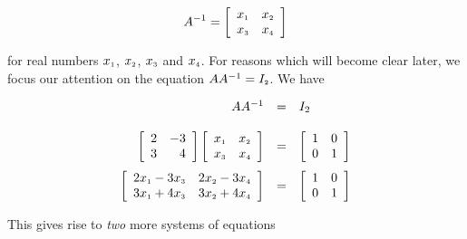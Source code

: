 \documentclass{ximera}
\begin{document}
\[  A^{-1} = \left[ \begin{array}{rr} x_{\mbox{\tiny$1$}} & x_{\mbox{\tiny$2$}} \\ x_{\mbox{\tiny$3$}} & x_{\mbox{\tiny$4$}} \\ \end{array} \right]\]

for real numbers $x_{\mbox{\tiny$1$}}$, $x_{\mbox{\tiny$2$}}$, $x_{\mbox{\tiny$3$}}$ and $x_{\mbox{\tiny$4$}}$.  For reasons which will become clear later, we focus our attention on the equation $AA^{-1} = I_{\mbox{\tiny$2$}}$.  We have

\[\begin{array}{rcl}

AA^{-1} & = & I_{2} \\ [13pt]

\left[ \begin{array}{rr} 2 & -3 \\ 3 & 4 \\ \end{array} \right] \left[ \begin{array}{rr} x_{\mbox{\tiny$1$}} & x_{\mbox{\tiny$2$}} \\ x_{\mbox{\tiny$3$}} & x_{\mbox{\tiny$4$}} \\ \end{array} \right]  & = & \left[ \begin{array}{rr} 1 & 0 \\ 0 & 1 \\ \end{array} \right] \\ [13pt]

\left[ \begin{array}{rr} 2x_{\mbox{\tiny$1$}} - 3x_{\mbox{\tiny$3$}} &  2x_{\mbox{\tiny$2$}} - 3x_{\mbox{\tiny$4$}} \\ 3x_{\mbox{\tiny$1$}} +4x_{\mbox{\tiny$3$}} &  3x_{\mbox{\tiny$2$}} +4x_{\mbox{\tiny$4$}} \\ \end{array} \right]  & = & \left[ \begin{array}{rr} 1 & 0 \\ 0 & 1 \\ \end{array} \right] \\

\end{array} \] 

This gives rise to \textit{two} more systems of equations
\end{document}
